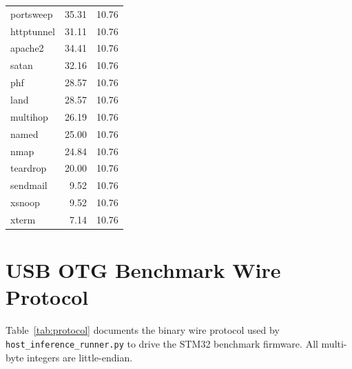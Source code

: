 \begin{table}[t]
\begin{tabular}{@{}lrr@{}}
portsweep    & 35.31 & 10.76 \\
httptunnel   & 31.11 & 10.76 \\
apache2      & 34.41 & 10.76 \\
satan        & 32.16 & 10.76 \\
phf          & 28.57 & 10.76 \\
land         & 28.57 & 10.76 \\
multihop     & 26.19 & 10.76 \\
named        & 25.00 & 10.76 \\
nmap         & 24.84 & 10.76 \\
teardrop     & 20.00 & 10.76 \\
sendmail     &  9.52 & 10.76 \\
xsnoop       &  9.52 & 10.76 \\
xterm        &  7.14 & 10.76 \\
\bottomrule
\end{tabular}
\end{table}

\section{USB OTG Benchmark Wire Protocol}
\label{app:protocol}

Table~\ref{tab:protocol} documents the binary wire protocol used by \texttt{host\_inference\_runner.py} to drive the STM32 benchmark firmware. All multi-byte integers are little-endian.

